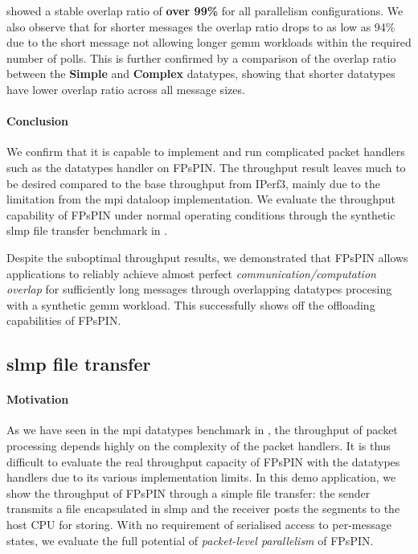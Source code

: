  showed a stable overlap ratio of \textbf{over 99\%} for all parallelism configurations.  We also observe that for shorter messages the overlap ratio drops to as low as 94\% due to the short message not allowing longer \ac{gemm} workloads within the required number of polls.  This is further confirmed by a comparison of the overlap ratio between the \textbf{Simple} and \textbf{Complex} datatypes, showing that shorter datatypes have lower overlap ratio across all message sizes.

\paragraph{Conclusion} We confirm that it is capable to implement and run complicated packet handlers such as the datatypes handler on FPsPIN.  The throughput result leaves much to be desired compared to the base throughput from IPerf3, mainly due to the limitation from the \ac{mpi} dataloop implementation.  We evaluate the throughput capability of FPsPIN under normal operating conditions through the synthetic \ac{slmp} file transfer benchmark in .

Despite the suboptimal throughput results, we demonstrated that FPsPIN allows applications to reliably achieve almost perfect \emph{communication/computation overlap} for sufficiently long messages through overlapping datatypes procesing with a synthetic \ac{gemm} workload.  This successfully shows off the offloading capabilities of FPsPIN.

\subsection{\acs{slmp} file transfer} \label{sec:slmp-demo}

\paragraph{Motivation} As we have seen in the \ac{mpi} datatypes benchmark in , the throughput of packet processing depends highly on the complexity of the packet handlers.  It is thus difficult to evaluate the real throughput capacity of FPsPIN with the datatypes handlers due to its various implementation limits.  In this demo application, we show the throughput of FPsPIN through a simple file transfer: the sender transmits a file encapsulated in \ac{slmp} and the receiver posts the segments to the host CPU for storing.  With no requirement of serialised access to per-message states, we evaluate the full potential of \emph{packet-level parallelism} of FPsPIN.

